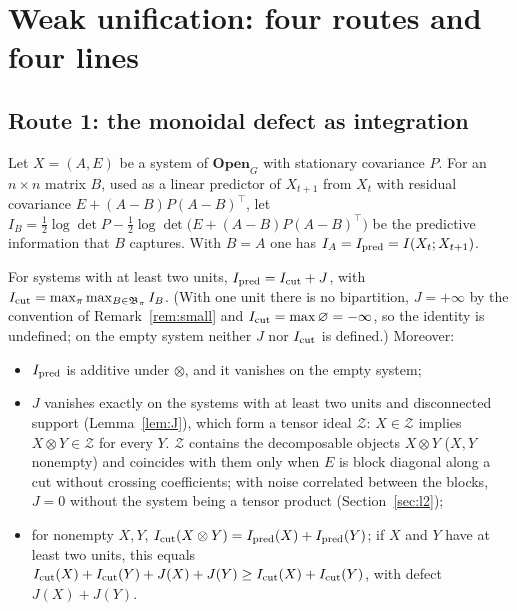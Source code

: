 \section{Weak unification: four routes and four lines}\label{sec:debil}
\subsection{Route 1: the monoidal defect as integration}\label{sec:via1}
Let $X=(A,E)$ be a system of $\mathbf{Open}_G$ with stationary covariance $P$. For an $n\times n$ matrix $B$, used as a linear predictor of $X_{t+1}$ from $X_t$ with residual covariance $E+(A-B)P(A-B)^\top$, let $I_B=\tfrac12\log\det P-\tfrac12\log\det\bigl(E+(A-B)P(A-B)^\top\bigr)$ be the predictive information that $B$ captures. With $B=A$ one has $I_A=I_{\rm pred}=I(X_t;X_{t+1})$.
\begin{proposition}\label{prop:decomposition}
For systems with at least two units, $I_{\rm pred}=I_{\rm cut}+J$, with $I_{\rm cut}=\max_\pi\max_{B\in\mathfrak B_\pi}I_B$. (With one unit there is no bipartition, $J=+\infty$ by the convention of Remark~\ref{rem:small} and $I_{\rm cut}=\max\varnothing=-\infty$, so the identity is undefined; on the empty system neither $J$ nor $I_{\rm cut}$ is defined.) Moreover:
\begin{itemize}
\item $I_{\rm pred}$ is additive under $\otimes$, and it vanishes on the empty system;
\item $J$ vanishes exactly on the systems with at least two units and disconnected support (Lemma~\ref{lem:J}), which form a tensor ideal $\mathcal Z$: $X\in\mathcal Z$ implies $X\otimes Y\in\mathcal Z$ for every $Y$. $\mathcal Z$ contains the decomposable objects $X\otimes Y$ ($X,Y$ nonempty) and coincides with them only when $E$ is block diagonal along a cut without crossing coefficients; with noise correlated between the blocks, $J=0$ without the system being a tensor product (Section~\ref{sec:l2});
\item for nonempty $X,Y$, $I_{\rm cut}(X\otimes Y)=I_{\rm pred}(X)+I_{\rm pred}(Y)$; if $X$ and $Y$ have at least two units, this equals $I_{\rm cut}(X)+I_{\rm cut}(Y)+J(X)+J(Y)\ge I_{\rm cut}(X)+I_{\rm cut}(Y)$, with defect $J(X)+J(Y)$.
\end{itemize}
\end{proposition}
